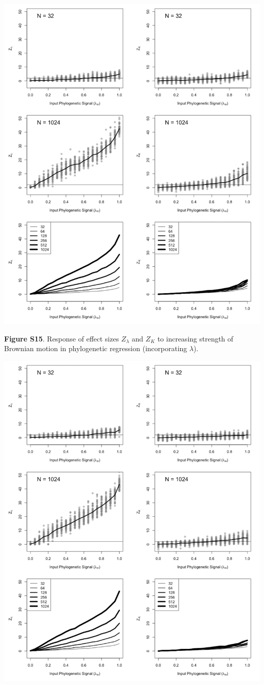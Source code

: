 \documentclass[
]{article}
\begin{document}
\includegraphics[width=0.95\linewidth]{fig.S15}

\textbf{Figure S15}. Response of effect sizes \(Z_{\lambda}\) and
\(Z_K\) to increasing strength of Brownian motion in phylogenetic
regression (incorporating \(\lambda\)).

\includegraphics[width=0.95\linewidth]{fig.S16}
\end{document}
